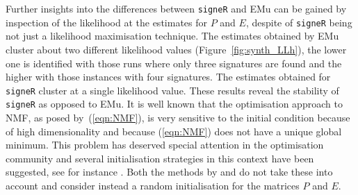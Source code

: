 \documentclass{bioinfo}
\begin{document}
Further insights into the differences between \texttt{signeR} and EMu 
can be gained by inspection of the likelihood at the estimates for $P$
and $E$, despite of \texttt{signeR} being not just a likelihood
maximisation technique. The estimates obtained by EMu cluster about
two different 
likelihood values (Figure~\ref{fig:synth_LLh}), the lower one is
identified with those runs where only three signatures are found and
the higher with those instances with four signatures. The estimates
obtained for \texttt{signeR} cluster at a single likelihood
value. These results reveal the stability
of \texttt{signeR} as opposed to EMu. It is well known that
the optimisation approach to NMF, as posed by~(\ref{eqn:NMF}), is
very sensitive to the initial condition because of high
dimensionality and because (\ref{eqn:NMF}) does not have a
unique global minimum. This problem has deserved special attention in
the optimisation community and several initialisation
strategies in this context have been suggested, see for instance
\cite{BBLPP, BG, LNACDarXiv}. Both the methods by \cite{FICMV} 
and \cite{A} do not take these into account and consider instead a
random initialisation for the matrices $P$ and $E$.
\end{document}
